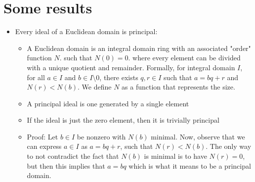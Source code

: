 \documentclass[11pt]{article}
\begin{document}
\section{Some results}
\begin{itemize}
    \item Every ideal of a Euclidean domain is principal:
        \begin{itemize}
            \item A Euclidean domain is an integral domain ring with an associated "order" function $N$. such that $N(0) = 0$. where every element can be divided with a unique quotient and remainder. Formally, for integral domain $I$, for all $a \in I$ and $b \in I \setminus 0$, there exists $q, r \in I$ such that $a = bq + r$ and $N(r) < N(b)$. We define $N$ as a function that represents the size. 
            \item A principal ideal is one generated by a single element
            \item If the ideal is just the zero element, then it is trivially principal
            \item Proof: Let $b \in I$ be nonzero with $N(b)$ minimal. Now, observe that we can express $a \in I$ as $a = bq + r$, such that $N(r) < N(b)$. The only way to not contradict the fact that $N(b)$ is minimal is to have $N(r) = 0$, but then this implies that $a = bq$ which is what it means to be a principal domain.
        \end{itemize}
\end{itemize}
\end{document}
